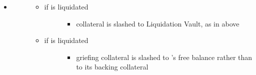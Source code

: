\documentclass[a4paper,10pt,english]{sphinxmanual}
\begin{document}
\begin{itemize}
\begin{description}
\end{description}

\item {} \begin{description}
\item[{}] \leavevmode\begin{itemize}
\item {} \begin{description}
\item[{if  is liquidated}] \leavevmode\begin{itemize}
\item {} 
collateral is slashed to Liquidation Vault, as in  above

\end{itemize}

\end{description}

\item {} \begin{description}
\item[{if  is liquidated}] \leavevmode\begin{itemize}
\item {} 
griefing collateral is slashed to ’s free balance rather than to its backing collateral

\end{itemize}

\end{description}

\end{itemize}

\end{description}

\end{itemize}
\end{document}

